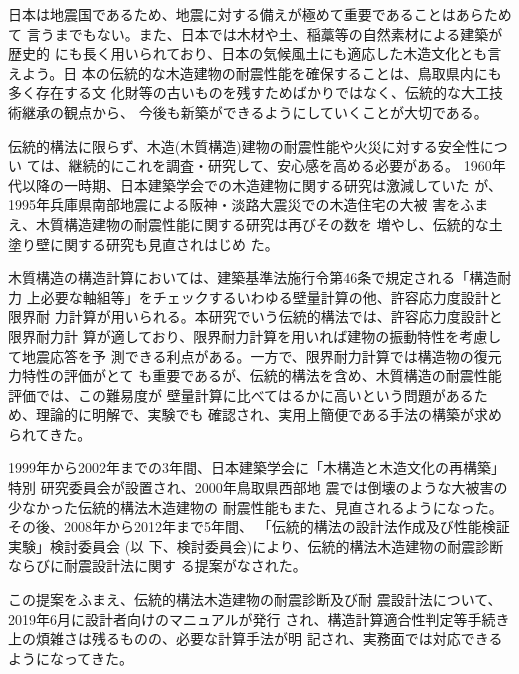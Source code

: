 \documentclass[11pt,a4paper,uplatex,dvipdfmx]{ujarticle} 		%
\newcommand{\研究課題名}{伝統的な木造土塗り壁の復元力に及ぼす軸組の影響に関する実験研究}
\newcommand{\研究機関名}{公立鳥取環境大学}
\newcommand{\研究代表者氏名}{中治弘行}
\newcommand{\私}{{\研究代表者氏名}}
\newcommand{\研究期間の最終元号年度}{8}  %
\begin{document}
日本は地震国であるため、地震に対する備えが極めて重要であることはあらためて
言うまでもない。また、日本では木材や土、稲藁等の自然素材による建築が歴史的
にも長く用いられており、日本の気候風土にも適応した木造文化とも言えよう。日
本の伝統的な木造建物の耐震性能を確保することは、鳥取県内にも多く存在する文
化財等の古いものを残すためばかりではなく、伝統的な大工技術継承の観点から、
今後も新築ができるようにしていくことが大切である。

伝統的構法に限らず、木造(木質構造)建物の耐震性能や火災に対する安全性につい
ては、継続的にこれを調査・研究して、安心感を高める必要がある。
1960年代以降の一時期、日本建築学会での木造建物に関する研究は激減していた
が、1995年兵庫県南部地震による阪神・淡路大震災での木造住宅の大被
害\cite{aij1995}をふまえ、木質構造建物の耐震性能に関する研究は再びその数を
増やし、伝統的な土塗り壁に関する研究も見直されはじめ
た\cite{tuchikabe1999,murakami2005}。

木質構造の構造計算においては、建築基準法施行令第46条で規定される「構造耐力
上必要な軸組等」をチェックするいわゆる壁量計算の他、許容応力度設計と限界耐
力計算が用いられる。本研究でいう伝統的構法では、許容応力度設計と限界耐力計
算が適しており、限界耐力計算を用いれば建物の振動特性を考慮して地震応答を予
測できる利点がある。一方で、限界耐力計算では構造物の復元力特性の評価がとて
も重要であるが、伝統的構法を含め、木質構造の耐震性能評価では、この難易度が
壁量計算に比べてはるかに高いという問題があるため、理論的に明解で、実験でも
確認され、実用上簡便である手法の構築が求められてきた。

1999年から2002年までの3年間、日本建築学会に「木構造と木造文化の再構築」特別
研究委員会が設置され\cite{sympo2001}、2000年鳥取県西部地
震\cite{kitahara2002}では倒壊のような大被害の少なかった伝統的構法木造建物の
耐震性能もまた、見直されるようになった。その後、2008年から2012年まで5年間、
「伝統的構法の設計法作成及び性能検証実験」検討委員会\cite{kentouiinkai} (以
下、検討委員会)により、伝統的構法木造建物の耐震診断ならびに耐震設計法に関す
る提案がなされた\cite{kentouiinkai2012}。

この提案\cite{kentouiinkai2012}をふまえ、伝統的構法木造建物の耐震診断及び耐
震設計法について、2019年6月に設計者向けのマニュアル\cite{manual2019}が発行
され、構造計算適合性判定等手続き上の煩雑さは残るものの、必要な計算手法が明
記され、実務面では対応できるようになってきた。
\end{document}
